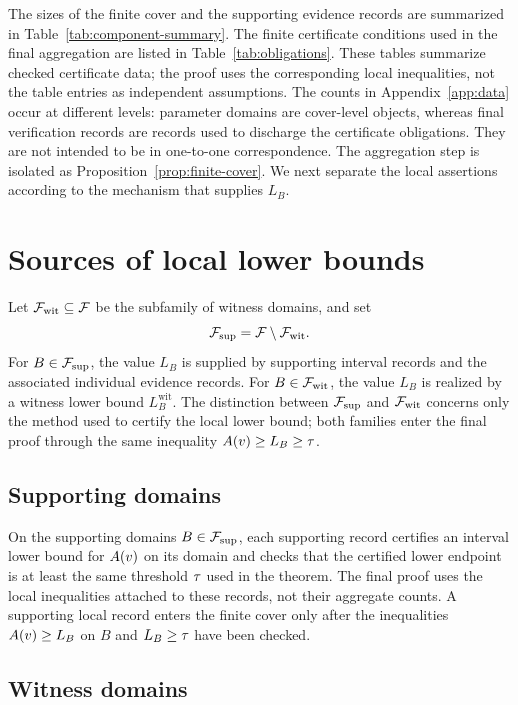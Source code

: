 \documentclass[11pt]{article}
\begin{document}
The sizes of the finite cover and the supporting evidence records are summarized in Table~\ref{tab:component-summary}.  The finite certificate conditions used in the final aggregation are listed in Table~\ref{tab:obligations}.  These tables summarize checked certificate data; the proof uses the corresponding local inequalities, not the table entries as independent assumptions.  The counts in Appendix~\ref{app:data} occur at different levels: parameter domains are cover-level objects, whereas final verification records are records used to discharge the certificate obligations.  They are not intended to be in one-to-one correspondence.  The aggregation step is isolated as Proposition~\ref{prop:finite-cover}.  We next separate the local assertions according to the mechanism that supplies \(L_B\).

\section{Sources of local lower bounds}\label{sec:local-sources}

Let \(\mathcal{F}_{\mathrm{wit}}\subseteq\mathcal{F}\) be the subfamily of witness domains, and set
\[
\mathcal{F}_{\mathrm{sup}}=\mathcal{F}\setminus\mathcal{F}_{\mathrm{wit}}.
\]
For \(B\in\mathcal{F}_{\mathrm{sup}}\), the value \(L_B\) is supplied by supporting interval records and the associated individual evidence records.  For \(B\in\mathcal{F}_{\mathrm{wit}}\), the value \(L_B\) is realized by a witness lower bound \(L_B^{\mathrm{wit}}\).  The distinction between \(\mathcal{F}_{\mathrm{sup}}\) and \(\mathcal{F}_{\mathrm{wit}}\) concerns only the method used to certify the local lower bound; both families enter the final proof through the same inequality \(A(v)\ge L_B\ge\tau\).

\subsection{Supporting domains}

On the supporting domains \(B\in\mathcal{F}_{\mathrm{sup}}\), each supporting record certifies an interval lower bound for \(A(v)\) on its domain and checks that the certified lower endpoint is at least the same threshold \(\tau\) used in the theorem.  The final proof uses the local inequalities attached to these records, not their aggregate counts.  A supporting local record enters the finite cover only after the inequalities \(A(v)\ge L_B\) on \(B\) and \(L_B\ge\tau\) have been checked.

\subsection{Witness domains}
\end{document}
